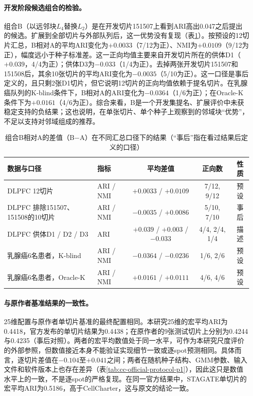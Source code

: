 \paragraph{开发阶段候选组合的检验。}组合B（以远邻块$L_4$替换$L_2$）是在开发切片151507上看到ARI高出0.047之后提出的候选。扩展到全部切片与外部队列后，这一优势没有复现（表\ref{tab:cc-b-minus-a-p1}）。按预设的12切片汇总，B相对A的平均ARI变化为$+0.0033$（7/12为正）、NMI为$+0.0109$（9/12为正），幅度远小于种子标准差。这一正向均值主要来自开发切片所在的供体D1（$+0.039$，4/4为正）；供体D3为$-0.033$（1/4为正）。去掉两张开发切片151507和151508后，其余10张切片的平均ARI变化为$-0.0035$（5/10为正）。这一口径是事后定义的，且只剩2张D1切片，但它说明12切片的正向均值依赖于提名切片。在乳腺癌队列的K-blind条件下，B相对A的ARI变化为$-0.0364$（1/6为正）；在Oracle-K条件下为$+0.0161$（4/6为正）。综合来看，B是一个开发集提名、扩展评价中未获稳定支持的负结果；这也说明，在单张切片、单个种子上观察到的邻域块“优势”，不足以支持对邻域组成的推荐。

\begin{table}[htbp]
\centering
\caption{组合B相对A的差值（B$-$A）在不同汇总口径下的结果（“事后”指在看过结果后定义的口径）}
\label{tab:cc-b-minus-a-p1}
\small
\begin{tabular}{llccc}
\toprule
数据与口径 & 指标 & 平均差值 & 正向数 & 性质\\
\midrule
DLPFC 12切片 & ARI / NMI & $+0.0033$ / $+0.0109$ & 7/12, 9/12 & 预设\\
DLPFC 排除151507、151508的10切片 & ARI / NMI & $-0.0035$ / $+0.0086$ & 5/10, 7/10 & 事后\\
DLPFC 供体D1 / D2 / D3 & ARI & $+0.039$ / $+0.003$ / $-0.033$ & 4/4, 2/4, 1/4 & 描述\\
乳腺癌6名患者，K-blind & ARI / NMI & $-0.0364$ / $-0.0236$ & 1/6, 2/6 & 预设\\
乳腺癌6名患者，Oracle-K & ARI / NMI & $+0.0161$ / $+0.0111$ & 4/6, 4/6 & 预设\\
\bottomrule
\end{tabular}
\end{table}

\paragraph{与原作者基准结果的一致性。}25维配置与原作者单切片基准的最终配置相同。本研究25维的宏平均ARI为0.4418，官方发布的单切片结果为0.4438；在原作者的9张测试切片上分别为0.4244与0.4235（事后对照）\cite{cellcharteranalyses2024}。两者的宏平均数值处于同一水平，可作为本研究尺度评价的外部参照，但数值接近本身不能验证实现细节一致或逐spot预测相同。具体而言，逐切片差值在$-0.104$至$+0.041$之间；两者在随机种子结构、GMM参数、输入文件和软件版本上也存在差异（表\ref{tab:cc-official-protocol-p1}），因此这只是数值水平上的一致，不是逐spot的严格复现。在同一官方结果中，STAGATE单切片的宏平均ARI为0.5186，高于CellCharter，这与原文的结论一致\cite{varrone2024}。

